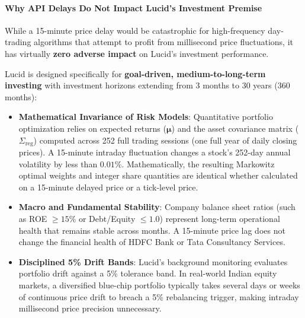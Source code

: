 \paragraph{Why API Delays Do Not Impact Lucid's Investment Premise}
While a 15-minute price delay would be catastrophic for high-frequency day-trading algorithms that attempt to profit from millisecond price fluctuations, it has virtually \textbf{zero adverse impact} on Lucid's investment performance. 

Lucid is designed specifically for \textbf{goal-driven, medium-to-long-term investing} with investment horizons extending from 3 months to 30 years (360 months):
\begin{itemize}
    \item \textbf{Mathematical Invariance of Risk Models}: Quantitative portfolio optimization relies on expected returns ($\boldsymbol{\mu}$) and the asset covariance matrix ($\Sigma_{\text{reg}}$) computed across 252 full trading sessions (one full year of daily closing prices). A 15-minute intraday fluctuation changes a stock's 252-day annual volatility by less than $0.01\%$. Mathematically, the resulting Markowitz optimal weights and integer share quantities are identical whether calculated on a 15-minute delayed price or a tick-level price.
    \item \textbf{Macro and Fundamental Stability}: Company balance sheet ratios (such as ROE $\ge 15\%$ or Debt/Equity $\le 1.0$) represent long-term operational health that remains stable across months. A 15-minute price lag does not change the financial health of HDFC Bank or Tata Consultancy Services.
    \item \textbf{Disciplined 5\% Drift Bands}: Lucid's background monitoring evaluates portfolio drift against a 5\% tolerance band. In real-world Indian equity markets, a diversified blue-chip portfolio typically takes several days or weeks of continuous price drift to breach a 5\% rebalancing trigger, making intraday millisecond price precision unnecessary.
\end{itemize}

